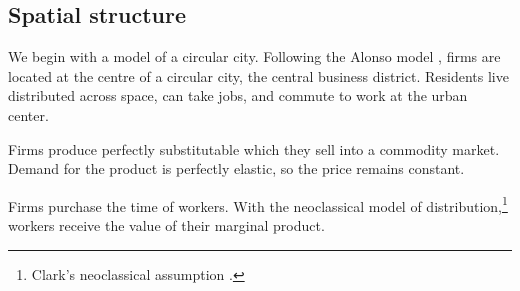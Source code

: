 \subsection{Spatial structure}

%  

We begin with a model of a circular city. %
Following the \gls{Alonso model} \cite{alonsoTheoryUrbanLand1960, alonsoLocationLandUse1964}, firms are located at the centre of a circular city, the central business district. Residents live distributed across space, can take jobs, and commute to work at the urban center. 

Firms produce perfectly \gls{substitutable} %
which they sell into a commodity market. Demand for the \gls{product} is \gls{perfectly elastic}, so the price remains constant. 

Firms purchase the time of workers. %
With the neoclassical model of distribution,\footnote{Clark's neoclassical assumption \cite{clarkDistributionWealthTheory1899}.} 
workers receive the value of their marginal product. 

 



